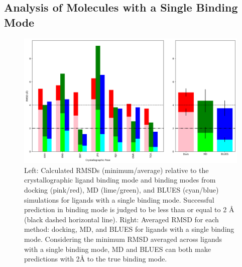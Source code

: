\subsection{Analysis of Molecules with a Single Binding Mode}

\begin{figure}
    \centering
    \includegraphics[width=\linewidth]{chapter6/Figures/singlebm.png}
    \caption[Single Binding Mode RMSD]{Left: Calculated RMSDs (minimum/average) relative to the crystallographic ligand binding mode and binding modes from docking (pink/red), MD (lime/green), and BLUES (cyan/blue) simulations for ligands with a single binding mode. Successful prediction in binding mode is judged to be less than or equal to 2 {\AA} (black dashed horizontal line). Right: Averaged RMSD for each method: docking, MD, and BLUES for ligands with a single binding mode. Considering the minimum RMSD averaged across ligands with a single binding mode, MD and BLUES can both make predictions with 2{\AA} to the true binding mode.}
    \label{fig:singlebm}
\end{figure}

